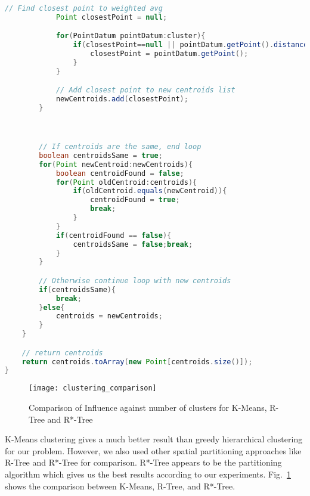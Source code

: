 \begin{lstlisting}[language=JAVA, caption=Algorithm for K means, label=alg:kmeans]
            // Find closest point to weighted avg
            Point closestPoint = null;

            for(PointDatum pointDatum:cluster){
                if(closestPoint==null || pointDatum.getPoint().distance(avg_point) < closestPoint.distance(avg_point)){
                    closestPoint = pointDatum.getPoint();
                }
            }

            // Add closest point to new centroids list
            newCentroids.add(closestPoint);
        }



        // If centroids are the same, end loop
        boolean centroidsSame = true;
        for(Point newCentroid:newCentroids){
            boolean centroidFound = false;
            for(Point oldCentroid:centroids){
                if(oldCentroid.equals(newCentroid)){
                    centroidFound = true;
                    break;
                }
            }
            if(centroidFound == false){
                centroidsSame = false;break;
            }
        }

        // Otherwise continue loop with new centroids
        if(centroidsSame){
            break;
        }else{
            centroids = newCentroids;
        }
    }

    // return centroids
    return centroids.toArray(new Point[centroids.size()]);
}
\end{lstlisting}

\begin{figure}[h]
\texttt{[image: clustering\_comparison]}
\caption{Comparison of Influence against number of clusters for K-Means, R-Tree and R*-Tree}
\label{fig:clustering_comparison}
\end{figure}

K-Means clustering gives a much better result than greedy hierarchical clustering for our problem. However, we also used other spatial partitioning approaches like R-Tree and R*-Tree for comparison. R*-Tree appears to be the partitioning algorithm which gives us the best results according to our experiments. Fig.~\ref{fig:clustering_comparison} shows the comparison between K-Means, R-Tree, and R*-Tree.

